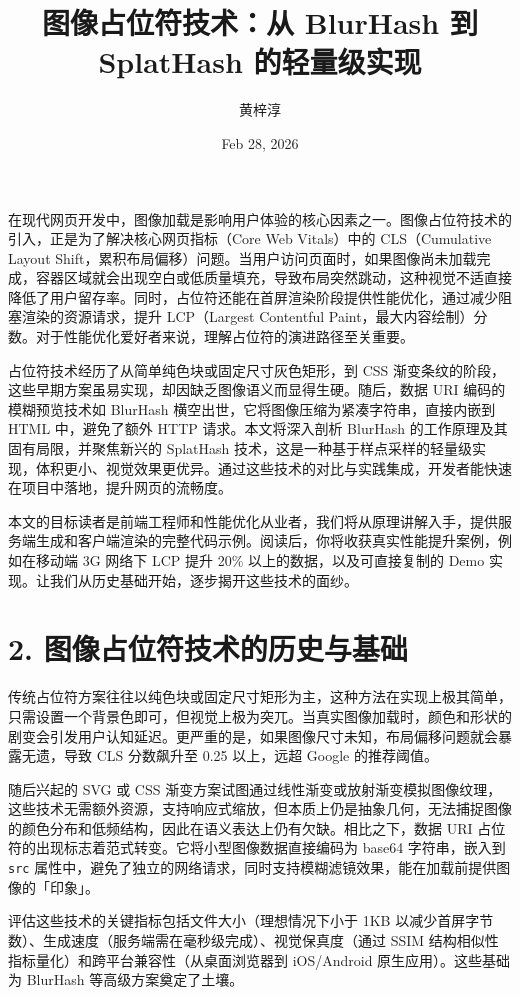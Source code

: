 \title{图像占位符技术：从 BlurHash 到 SplatHash 的轻量级实现}
\author{黄梓淳}
\date{Feb 28, 2026}
\maketitle
在现代网页开发中，图像加载是影响用户体验的核心因素之一。图像占位符技术的引入，正是为了解决核心网页指标（Core Web Vitals）中的 CLS（Cumulative Layout Shift，累积布局偏移）问题。当用户访问页面时，如果图像尚未加载完成，容器区域就会出现空白或低质量填充，导致布局突然跳动，这种视觉不适直接降低了用户留存率。同时，占位符还能在首屏渲染阶段提供性能优化，通过减少阻塞渲染的资源请求，提升 LCP（Largest Contentful Paint，最大内容绘制）分数。对于性能优化爱好者来说，理解占位符的演进路径至关重要。\par
占位符技术经历了从简单纯色块或固定尺寸灰色矩形，到 CSS 渐变条纹的阶段，这些早期方案虽易实现，却因缺乏图像语义而显得生硬。随后，数据 URI 编码的模糊预览技术如 BlurHash 横空出世，它将图像压缩为紧凑字符串，直接内嵌到 HTML 中，避免了额外 HTTP 请求。本文将深入剖析 BlurHash 的工作原理及其固有局限，并聚焦新兴的 SplatHash 技术，这是一种基于样点采样的轻量级实现，体积更小、视觉效果更优异。通过这些技术的对比与实践集成，开发者能快速在项目中落地，提升网页的流畅度。\par
本文的目标读者是前端工程师和性能优化从业者，我们将从原理讲解入手，提供服务端生成和客户端渲染的完整代码示例。阅读后，你将收获真实性能提升案例，例如在移动端 3G 网络下 LCP 提升 20\%{} 以上的数据，以及可直接复制的 Demo 实现。让我们从历史基础开始，逐步揭开这些技术的面纱。\par
\chapter{2. 图像占位符技术的历史与基础}
传统占位符方案往往以纯色块或固定尺寸矩形为主，这种方法在实现上极其简单，只需设置一个背景色即可，但视觉上极为突兀。当真实图像加载时，颜色和形状的剧变会引发用户认知延迟。更严重的是，如果图像尺寸未知，布局偏移问题就会暴露无遗，导致 CLS 分数飙升至 0.25 以上，远超 Google 的推荐阈值。\par
随后兴起的 SVG 或 CSS 渐变方案试图通过线性渐变或放射渐变模拟图像纹理，这些技术无需额外资源，支持响应式缩放，但本质上仍是抽象几何，无法捕捉图像的颜色分布和低频结构，因此在语义表达上仍有欠缺。相比之下，数据 URI 占位符的出现标志着范式转变。它将小型图像数据直接编码为 base64 字符串，嵌入到 \texttt{src} 属性中，避免了独立的网络请求，同时支持模糊滤镜效果，能在加载前提供图像的「印象」。\par
评估这些技术的关键指标包括文件大小（理想情况下小于 1KB 以减少首屏字节数）、生成速度（服务端需在毫秒级完成）、视觉保真度（通过 SSIM 结构相似性指标量化）和跨平台兼容性（从桌面浏览器到 iOS/Android 原生应用）。这些基础为 BlurHash 等高级方案奠定了土壤。\par
